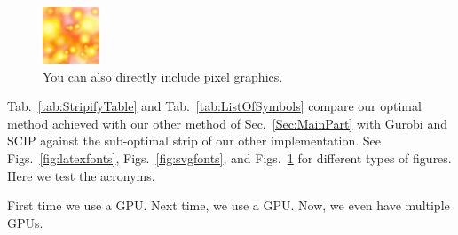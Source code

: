\begin{figure}
    \centering
    \includegraphics[width=\columnwidth]{imgs/img.png}
    \caption[Pixel graphics]{You can also directly include pixel graphics.}\label{fig:pixel}
\end{figure}

Tab.~\ref{tab:StripifyTable} and Tab.~\ref{tab:ListOfSymbols} compare our optimal 
method achieved with our other method
of Sec.~\ref{Sec:MainPart} with Gurobi and SCIP against the sub-optimal strip of our 
other implementation.
See Figs.~\ref{fig:latexfonts}, Figs.~\ref{fig:svgfonts}, and Figs.~\ref{fig:pixel} for different types of figures.
Here we test the acronyms.

First time we use a \ac{GPU}.
Next time, we use a \ac{GPU}.
Now, we even have multiple \acp{GPU}.
